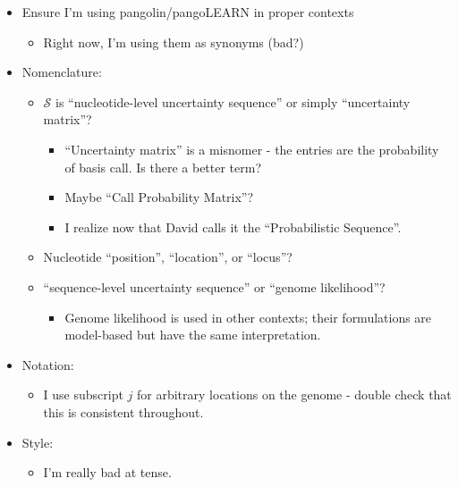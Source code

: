\documentclass[
]{article}
\providecommand{\tightlist}{%
  \setlength{\itemsep}{0pt}\setlength{\parskip}{0pt}}
\newcommand{\nps}{\mathcal{S}} %
\begin{document}
\begin{itemize}
\tightlist
\item
  Ensure I'm using pangolin/pangoLEARN in proper contexts

  \begin{itemize}
  \tightlist
  \item
    Right now, I'm using them as synonyms (bad?)
  \end{itemize}
\item
  Nomenclature:

  \begin{itemize}
  \tightlist
  \item
    \(\nps\) is ``nucleotide-level uncertainty sequence'' or simply
    ``uncertainty matrix''?

    \begin{itemize}
    \tightlist
    \item
      ``Uncertainty matrix'' is a misnomer - the entries are the
      probability of basis call. Is there a better term?
    \item
      Maybe ``Call Probability Matrix''?
    \item
      I realize now that David calls it the ``Probabilistic Sequence''.
    \end{itemize}
  \item
    Nucleotide ``position'', ``location'', or ``locus''?
  \item
    ``sequence-level uncertainty sequence'' or ``genome likelihood''?

    \begin{itemize}
    \tightlist
    \item
      Genome likelihood is used in other contexts; their formulations
      are model-based but have the same interpretation.
    \end{itemize}
  \end{itemize}
\item
  Notation:

  \begin{itemize}
  \tightlist
  \item
    I use subscript \(j\) for arbitrary locations on the genome - double
    check that this is consistent throughout.
  \end{itemize}
\item
  Style:

  \begin{itemize}
  \tightlist
  \item
    I'm really bad at tense.
  \end{itemize}
\end{itemize}
\end{document}

